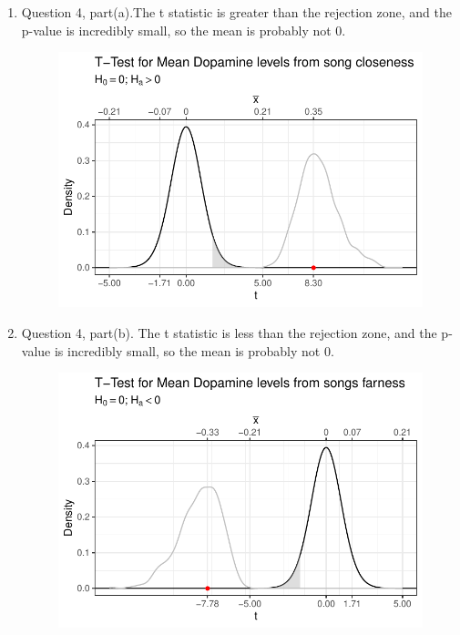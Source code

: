 \documentclass{article}\usepackage[]{graphicx}\usepackage[]{xcolor}
\makeatletter
\def\maxwidth{ %
  \ifdim\Gin@nat@width>\linewidth
    \linewidth
  \else
    \Gin@nat@width
  \fi
}
\newenvironment{knitrout}{}{} %
\makeatother
\begin{document}
\begin{enumerate}
\begin{enumerate}
  \item Question 4, part(a).The t statistic is greater than the rejection zone, and the p-value is incredibly small, so the mean is probably not 0. 

\begin{figure}[H]
\begin{center}
\begin{knitrout}
\color{fgcolor}
\includegraphics[width=\maxwidth]{figure/unnamed-chunk-9-1} 
\end{knitrout}
\label{plot2} 
\end{center}
\end{figure}

  \item Question 4, part(b). The t statistic is less than the rejection zone, and the p-value is incredibly small, so the mean is probably not 0.

\begin{figure}[H]
\begin{center}
\begin{knitrout}
\color{fgcolor}
\includegraphics[width=\maxwidth]{figure/unnamed-chunk-10-1} 
\end{knitrout}
\label{plot3} 
\end{center}
\end{figure}


\end{enumerate}
\end{enumerate}
\end{document}
